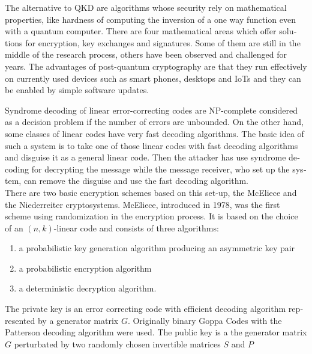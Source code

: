 \documentclass[a4paper,11pt,draft]{article}
\begin{document}
\begin{otherlanguage}{english}
\begin{multicols}{2}
The alternative to QKD are algorithms whose security rely on mathematical properties, like hardness of computing the inversion of a one way function even with a quantum computer. There are four mathematical areas which offer solutions for encryption, key exchanges and signatures. Some of them are still in the middle of the research process, others have been observed and challenged for years. The advantages of post-quantum cryptography are that they run effectively on currently used devices such as smart phones, desktops and IoTs and they can be enabled by simple software updates.

Syndrome decoding of linear error-correcting codes are NP-complete considered as a decision problem if the number of errors are unbounded.  On the other hand, some classes of linear codes have very fast decoding algorithms. The basic idea of such a system is to take one of those linear codes with fast decoding algorithms and disguise it as a general linear code. Then the attacker has use syndrome decoding for decrypting the message while the message receiver, who set up the system, can remove the disguise and use the fast decoding algorithm. \\

There are two basic encryption schemes based on this set-up, the McEliece and the Niederreiter cryptosystems. McEliece, introduced in 1978, was the first scheme using randomization in the encryption process. It is based on the choice of an $(n,k)$-linear code and consists of three algorithms:

\begin{enumerate}
\item[1)] a probabilistic key generation algorithm producing an asymmetric key pair
\item[2)] a probabilistic encryption algorithm
\item[3)] a deterministic decryption algorithm.
\end{enumerate}

The private key is an error correcting code with efficient decoding algorithm represented by a generator matrix $G$. Originally binary Goppa Codes with the Patterson decoding algorithm were used. The public key is a the generator matrix $G$ perturbated by two randomly chosen invertible matrices $S$ and $P$


\end{multicols}
\end{otherlanguage}
\end{document}

